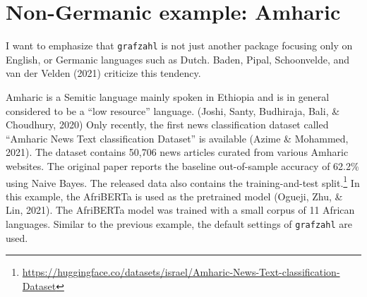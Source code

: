 \documentclass[
  english,
  man,floatsintext]{apa7}
\newenvironment{Shaded}{\begin{snugshade}}{\end{snugshade}}
\newcommand{\CommentTok}[1]{\textcolor[rgb]{0.56,0.35,0.01}{\textit{#1}}}
\newcommand{\DataTypeTok}[1]{\textcolor[rgb]{0.13,0.29,0.53}{#1}}
\newcommand{\KeywordTok}[1]{\textcolor[rgb]{0.13,0.29,0.53}{\textbf{#1}}}
\newcommand{\NormalTok}[1]{#1}
\newcommand{\OperatorTok}[1]{\textcolor[rgb]{0.81,0.36,0.00}{\textbf{#1}}}
\newcommand{\StringTok}[1]{\textcolor[rgb]{0.31,0.60,0.02}{#1}}
\begin{document}
\hypertarget{non-germanic-example-amharic}{%
\section{Non-Germanic example: Amharic}\label{non-germanic-example-amharic}}

I want to emphasize that \texttt{grafzahl} is not just another package focusing only on English, or Germanic languages such as Dutch. Baden, Pipal, Schoonvelde, and van der Velden (2021) criticize this tendency.

Amharic is a Semitic language mainly spoken in Ethiopia and is in general considered to be a ``low resource'' language. (Joshi, Santy, Budhiraja, Bali, \& Choudhury, 2020) Only recently, the first news classification dataset called ``Amharic News Text classification Dataset'' is available (Azime \& Mohammed, 2021). The dataset contains 50,706 news articles curated from various Amharic websites. The original paper reports the baseline out-of-sample accuracy of 62.2\% using Naive Bayes. The released data also contains the training-and-test split.\footnote{\url{https://huggingface.co/datasets/israel/Amharic-News-Text-classification-Dataset}} In this example, the AfriBERTa is used as the pretrained model (Ogueji, Zhu, \& Lin, 2021). The AfriBERTa model was trained with a small corpus of 11 African languages. Similar to the previous example, the default settings of \texttt{grafzahl} are used.

\begin{Shaded}
\end{Shaded}
\end{document}
